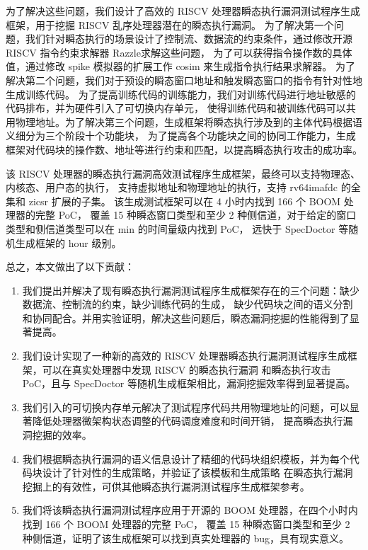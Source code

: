 为了解决这些问题，我们设计了高效的 RISCV 处理器瞬态执行漏洞测试程序生成框架，用于挖掘 RISCV 乱序处理器潜在的瞬态执行漏洞。
为了解决第一个问题，我们针对瞬态执行的场景设计了控制流、数据流的约束条件，通过修改开源 RISCV 指令约束求解器 Razzle\cite{razzle}求解这些问题，
为了可以获得指令操作数的具体值，通过修改 spike 模拟器\cite{riscv-isa-sim}的扩展工作 cosim \cite{riscv-isa-cosim}来生成指令执行结果求解器。
为了解决第二个问题，我们对于预设的瞬态窗口地址和触发瞬态窗口的指令有针对性地生成训练代码。
为了提高训练代码的训练能力，我们对训练代码进行地址敏感的代码排布，并为硬件引入了可切换内存单元，
使得训练代码和被训练代码可以共用物理地址。为了解决第三个问题，生成框架将瞬态执行涉及到的主体代码根据语义细分为三个阶段十个功能块，
为了提高各个功能块之间的协同工作能力，生成框架对代码块的操作数、地址等进行约束和匹配，以提高瞬态执行攻击的成功率。\par

该 RISCV 处理器的瞬态执行漏洞高效测试程序生成框架，最终可以支持物理态、内核态、用户态的执行，
支持虚拟地址和物理地址的执行，支持 rv64imafdc 的全集和 zicsr 扩展的子集\cite{riscv-isa-manual-all}。
该生成测试框架可以在 4 小时内找到 166 个 BOOM 处理器的完整 PoC，
覆盖 15 种瞬态窗口类型和至少 2 种侧信道，对于给定的窗口类型和侧信道类型可以在 min 的时间量级内找到 PoC，
远快于 SpecDoctor\cite{hur2022specdoctor} 等随机生成框架的 hour 级别。\par

总之，本文做出了以下贡献：\par

\begin{enumerate}
    \item 我们提出并解决了现有瞬态执行漏洞测试程序生成框架存在的三个问题：缺少数据流、控制流的约束，缺少训练代码的生成，
缺少代码块之间的语义分割和协同配合。并用实验证明，解决这些问题后，瞬态漏洞挖掘的性能得到了显著提高。\par
    \item 我们设计实现了一种新的高效的 RISCV 处理器瞬态执行漏洞测试程序生成框架，可以在真实处理器中发现 RISCV 的瞬态执行漏洞
    和瞬态执行攻击 PoC，且与 SpecDoctor 等随机生成框架相比，漏洞挖掘效率得到显著提高。\par
    \item 我们引入的可切换内存单元解决了测试程序代码共用物理地址的问题，可以显著降低处理器微架构状态调整的代码调度难度和时间开销，
提高瞬态执行漏洞挖掘的效率。\par
    \item 我们根据瞬态执行漏洞的语义信息设计了精细的代码块组织模板，并为每个代码块设计了针对性的生成策略，并验证了该模板和生成策略
在瞬态执行漏洞挖掘上的有效性，可供其他瞬态执行漏洞测试程序生成框架参考。\par
    \item 我们将该瞬态执行漏洞测试程序应用于开源的 BOOM 处理器，在四个小时内找到 166 个 BOOM 处理器的完整 PoC，
覆盖 15 种瞬态窗口类型和至少 2 种侧信道，证明了该生成框架可以找到真实处理器的 bug，具有现实意义。\par
\end{enumerate}


